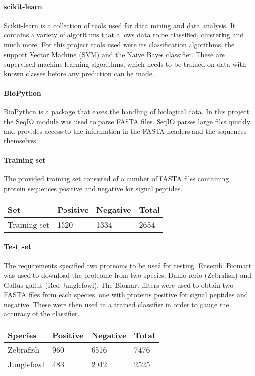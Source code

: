 \documentclass[10pt,letterpaper]{article}
\begin{document}
\paragraph{scikit-learn}
Scikit-learn is a collection of tools used for data mining and data analysis. It contains a variety of algorithms that allows data to be classified, clustering and much more. For this project tools used were its classification algorithms, the support Vector Machine (SVM) and the Naive Bayes classifier. These are supervised machine learning algorithms, which needs to be trained on data with known classes before any prediction can be made.  
\paragraph{BioPython}
BioPython is a package that eases the handling of biological data. In this project the SeqIO module was used to parse FASTA files. SeqIO parses large files quickly and provides access to the information in the FASTA headers and the sequences themselves. 
\paragraph{Training set}
The provided training set consisted of a number of FASTA files containing protein sequences positive and negative for signal peptides. 
\begin{center}
    \begin{tabular}{ | l | l | l | l |}
    \hline
    Set & Positive & Negative & Total \\ \hline
    Training set & 1320 & 1334 & 2654 \\ \hline
    \end{tabular}
\end{center}
\paragraph{Test set}
The requirements specified two proteoms to be used for testing. Ensembl Biomart was used to download the proteome from two species, Danio rerio (Zebrafish) and Gallus gallus (Red Junglefowl). The Biomart filters were used to obtain two FASTA files from each species, one with proteins positive for signal peptides and negative. These were then used in a trained classifier in order to gauge the accuracy of the classifier. 
\begin{center}
    \begin{tabular}{ | l | l | l | l |}
    \hline
    Species & Positive & Negative & Total \\ \hline
    Zebrafish & 960 & 6516 & 7476 \\ \hline
    Junglefowl & 483 & 2042 & 2525\\ \hline
    \end{tabular}
\end{center}
\end{document}
